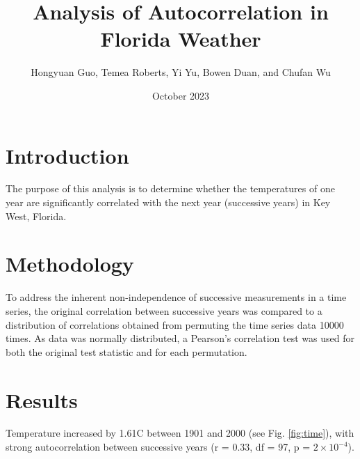 \documentclass[12pt,a4paper]{article}
\title{Analysis of Autocorrelation in Florida Weather}
\author{Hongyuan Guo, Temea Roberts, Yi Yu, Bowen Duan, and Chufan Wu}
\date{October 2023}
\begin{document}
\maketitle

\section{Introduction}
The purpose of this analysis is to determine whether the temperatures of one year are significantly correlated with the next year (successive years) in Key West, Florida.

\section{Methodology}
To address the inherent non-independence of successive measurements in a time series, the original correlation between successive years was compared to a distribution of correlations obtained from permuting the time series data 10000 times. As data was normally distributed, a Pearson's correlation test was used for both the original test statistic and for each permutation. 

\section{Results}
Temperature increased by 1.61\textdegree C between 1901 and 2000 (see Fig. \ref{fig:time}), with strong autocorrelation between successive years (r = 0.33, df = 97, p = \(2 \times 10^{-4}\)). 
\end{document}
